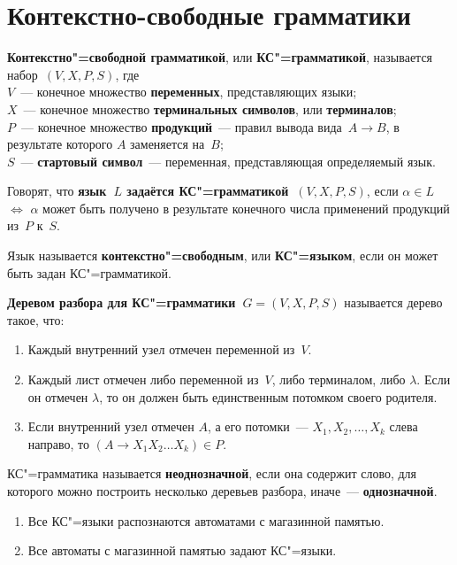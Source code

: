 \section{Контекстно-свободные грамматики}
  \textbf{Контекстно"=свободной грамматикой}, или \textbf{КС"=грамматикой}, называется набор~$(V, X, P, S)$, где\\
$V$~--- конечное множество \textbf{переменных}, представляющих языки;\\
$X$~--- конечное множество \textbf{терминальных символов}, или \textbf{терминалов};\\
$P$~--- конечное множество \textbf{продукций}~--- правил вывода вида~$A \to B$, в результате которого $A$ заменяется на~$B$;\\
$S$~--- \textbf{стартовый символ}~--- переменная, представляющая определяемый язык.

Говорят, что \textbf{язык~$L$ задаётся КС"=грамматикой~$(V, X, P, S)$}, если $\alpha \in L$ $\Leftrightarrow$ $\alpha$ может быть получено в результате конечного числа применений продукций из~$P$ к~$S$.

 Язык называется \textbf{контекстно"=свободным}, или \textbf{КС"=языком}, если он может быть задан КС"=грамматикой.

\textbf{Деревом разбора для КС"=грамматики~$G = (V, X, P, S)$} называется дерево такое, что:
\begin{enumerate}
	\item Каждый внутренний узел отмечен переменной из~$V$.
	\item Каждый лист отмечен либо переменной из~$V$, либо терминалом, либо $\lambda$.
	Если он отмечен $\lambda$, то он должен быть единственным потомком своего родителя.
	\item Если внутренний узел отмечен $A$, а его потомки~--- $X_1, X_2, \ldots, X_k$ слева направо, то $(A \to X_1 X_2 \ldots X_k) \in P$.
\end{enumerate}

КС"=грамматика называется \textbf{неоднозначной}, если она содержит слово, для которого можно построить несколько деревьев разбора, иначе~--- \textbf{однозначной}.

\begin{theorem}
\begin{enumerate}
	\item Все КС"=языки распознаются автоматами с магазинной памятью.
	\item Все автоматы с магазинной памятью задают КС"=языки.
\end{enumerate}
\end{theorem}

